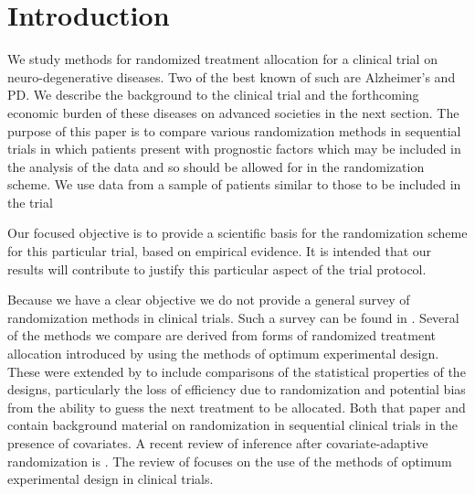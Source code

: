 \documentclass[number,12pt,review]{elsarticle}
\begin{document}
\linenumbers%

\section{Introduction}

\label{introsec}

We study methods for randomized treatment allocation for a clinical trial on neuro-degenerative diseases. Two of the best known of such  are Alzheimer's and \ac{PD}. We describe the background to the clinical trial and the forthcoming economic burden of these diseases on advanced societies in the next section. The purpose of this paper is to compare various randomization methods in sequential trials in which patients present with prognostic factors which may be included in the analysis of the data and so should be allowed for in the randomization scheme. We use data from a sample of patients similar to those to be included in the trial

Our focused objective is to provide a scientific basis for the randomization scheme for this particular trial, based on empirical evidence. It is intended that our results will contribute to justify this particular aspect of the trial protocol.

Because we have a clear objective we do not provide a general survey of randomization methods in clinical trials. Such a survey can be found in \citet{ros+l:2016}. Several of the methods we compare are derived from forms of randomized treatment allocation introduced by \citet{aca:82} using the methods of optimum experimental design. These were extended by \citet{aca:2002} to include comparisons of the statistical properties of the designs, particularly the loss of efficiency due to randomization and potential bias from the ability to guess the next treatment to be allocated. Both that paper and \citet{ros+sverd:2008} contain background material on randomization in sequential clinical trials in the presence of covariates. A recent review of inference after covariate-adaptive randomization is \citet{MaHuCovar:2020}. The review of \citet{sverdlov2020optimal} focuses on the use of the methods of optimum experimental design in clinical trials.
\end{document}
